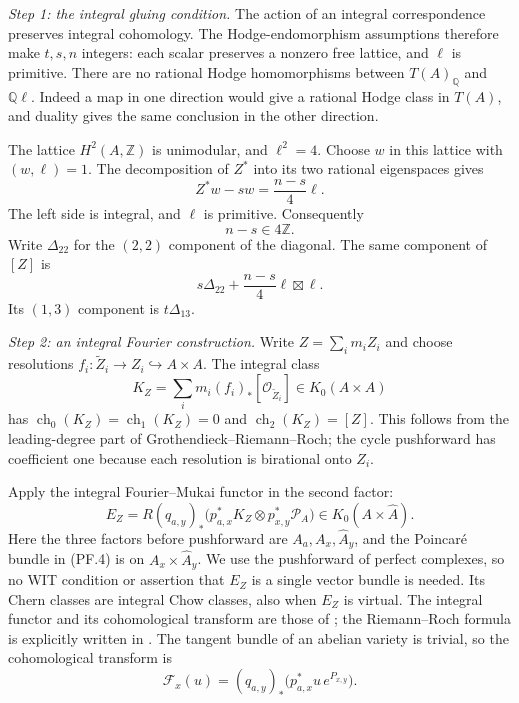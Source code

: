\emph{Step 1: the integral gluing condition.}
The action of an integral correspondence preserves integral
cohomology. The Hodge-endomorphism assumptions therefore make
$t,s,n$ integers: each scalar preserves a nonzero free lattice,
and $\ell$ is primitive. There are no rational Hodge homomorphisms
between $T(A)_{\mathbb Q}$ and $\mathbb Q\ell$. Indeed a map in
one direction would give a rational Hodge class in $T(A)$, and
duality gives the same conclusion in the other direction.

The lattice $H^2(A,\mathbb Z)$ is unimodular, and $\ell^2=4$.
Choose $w$ in this lattice with $(w,\ell)=1$. The decomposition
of $Z^*$ into its two rational eigenspaces gives
\[
       Z^*w-sw=\frac{n-s}{4}\ell.
\]
The left side is integral, and $\ell$ is primitive. Consequently
\[
                         n-s\in4\mathbb Z.            \tag{PF.2}
\]
Write $\Delta_{22}$ for the $(2,2)$ component of the diagonal.
The same component of $[Z]$ is
\[
                  s\Delta_{22}+\frac{n-s}{4}\ell\boxtimes\ell.
                                                               \tag{PF.3}
\]
Its $(1,3)$ component is $t\Delta_{13}$.

\emph{Step 2: an integral Fourier construction.}
Write $Z=\sum_i m_iZ_i$ and choose resolutions
$f_i:\widetilde Z_i\to Z_i\hookrightarrow A\times A$.
The integral class
\[
                  K_Z=\sum_i m_i(f_i)_*[\mathcal O_{\widetilde Z_i}]
                         \in K_0(A\times A)
\]
has $\operatorname{ch}_0(K_Z)=\operatorname{ch}_1(K_Z)=0$
and $\operatorname{ch}_2(K_Z)=[Z]$. This follows from the
leading-degree part of Grothendieck--Riemann--Roch; the cycle
pushforward has coefficient one because each resolution is
birational onto $Z_i$.

Apply the integral Fourier--Mukai functor in the second factor:
\[
 E_Z=R(q_{a,y})_*
       \bigl(p_{a,x}^*K_Z\otimes p_{x,y}^*\mathcal P_A\bigr)
       \in K_0(A\times\widehat A).
                                                               \tag{PF.4}
\]
Here the three factors before pushforward are $A_a,A_x,\widehat A_y$,
and the Poincar\'e bundle in (PF.4) is on $A_x\times\widehat A_y$.
We use the pushforward of perfect complexes, so no WIT condition
or assertion that $E_Z$ is a single vector bundle is needed.
Its Chern classes are integral Chow classes, also when $E_Z$
is virtual. The integral functor and its cohomological transform
are those of \citet[\S1, (1.4), and Theorem 2.2]{cyMukai1981PF};
the Riemann--Roch formula is explicitly written in
\citet[(2.6)--(2.8), author p.~5]{cyYoshioka2001PF}.
The tangent bundle of an abelian variety is trivial, so the
cohomological transform is
\[
                   \mathcal F_x(u)=(q_{a,y})_*
                                  \bigl(p_{a,x}^*u\,e^{P_{x,y}}\bigr).
\]

